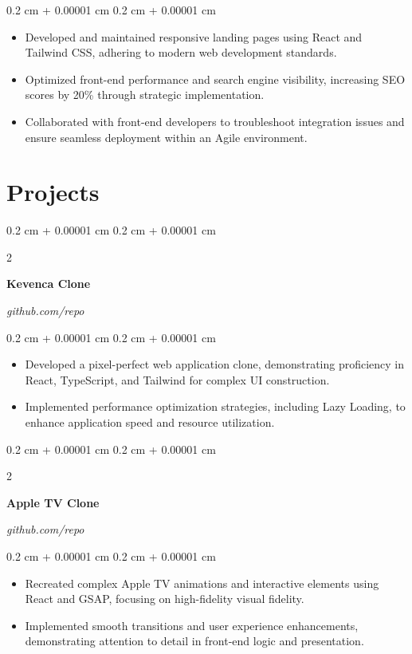 \documentclass[10pt, a4paper]{article}
\newenvironment{highlights}{
    \begin{itemize}[
        topsep=0.10 cm,
        parsep=0.10 cm,
        partopsep=0pt,
        itemsep=0pt,
        leftmargin=0.4 cm + 10pt
    ]
}{
    \end{itemize}
} %
\newenvironment{onecolentry}{
    \begin{adjustwidth}{
        0.2 cm + 0.00001 cm
    }{
        0.2 cm + 0.00001 cm
    }
}{
    \end{adjustwidth}
} %
\newenvironment{twocolentry}[2][]{
    \onecolentry
    \def\secondColumn{#2}
    \setcolumnwidth{\fill, 4.5 cm}
    \begin{paracol}{2}
}{
    \switchcolumn \raggedleft \secondColumn
    \end{paracol}
    \endonecolentry
} %
\begin{document}
        \vspace{0.10 cm}
        \begin{onecolentry}
        \begin{highlights}
            \item Developed and maintained responsive landing pages using React and Tailwind CSS, adhering to modern web development standards.
\item Optimized front-end performance and search engine visibility, increasing SEO scores by 20\% through strategic implementation.
\item Collaborated with front-end developers to troubleshoot integration issues and ensure seamless deployment within an Agile environment.
        \end{highlights}
        \end{onecolentry}
        \vspace{0.2 cm}
        

    \section{Projects}
\begin{twocolentry}{
        \textit{github.com/repo}
    }
    \textbf{Kevenca Clone}
    \end{twocolentry}

    \vspace{0.10 cm}
    \begin{onecolentry}
    \begin{highlights}
        \item Developed a pixel-perfect web application clone, demonstrating proficiency in React, TypeScript, and Tailwind for complex UI construction.
\item Implemented performance optimization strategies, including Lazy Loading, to enhance application speed and resource utilization.
    \end{highlights}
    \end{onecolentry}
    \vspace{0.2 cm}
\begin{twocolentry}{
        \textit{github.com/repo}
    }
    \textbf{Apple TV Clone}
    \end{twocolentry}

    \vspace{0.10 cm}
    \begin{onecolentry}
    \begin{highlights}
        \item Recreated complex Apple TV animations and interactive elements using React and GSAP, focusing on high-fidelity visual fidelity.
\item Implemented smooth transitions and user experience enhancements, demonstrating attention to detail in front-end logic and presentation.
    \end{highlights}
    \end{onecolentry}
    \vspace{0.2 cm}
\end{document}
